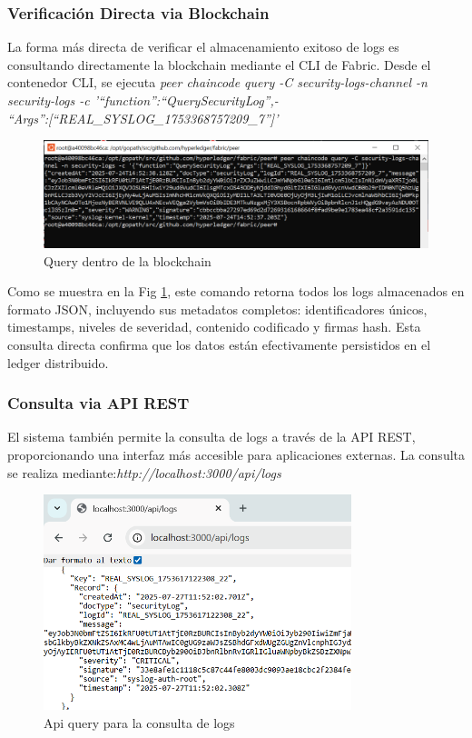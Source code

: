\subsubsection{Verificación Directa via Blockchain}
La forma más directa de verificar el almacenamiento exitoso de logs es consultando directamente la blockchain mediante el CLI de Fabric. Desde el contenedor CLI, se ejecuta \textit{peer chaincode query -C security-logs-channel -n security-logs -c '{“function”:“QuerySecurityLog”,-\\“Args”:[“REAL\_SYSLOG\_1753368757209\_7”]}'}
\begin{figure}[H]
    \centering
    \includegraphics[width=1\textwidth]{figuras/query_blockchain.png}
    \caption{Query dentro de la blockchain}
    \label{fig:query_blockchain}
\end{figure}

Como se muestra en la Fig \ref{fig:query_blockchain}, este comando retorna todos los logs almacenados en formato JSON, incluyendo sus metadatos completos: identificadores únicos, timestamps, niveles de severidad, contenido codificado y firmas hash. Esta consulta directa confirma que los datos están efectivamente persistidos en el ledger distribuido.

\subsubsection{Consulta via API REST}
El sistema también permite la consulta de logs a través de la API REST, proporcionando una interfaz más accesible para aplicaciones externas. La consulta se realiza mediante:\textit{http://localhost:3000/api/logs}
\newpage
\begin{figure}[H]
    \centering
    \includegraphics[width=0.8\textwidth]{figuras/api_query.png}
    \caption{Api query para la consulta de logs}
    \label{fig:api_query}
\end{figure}

